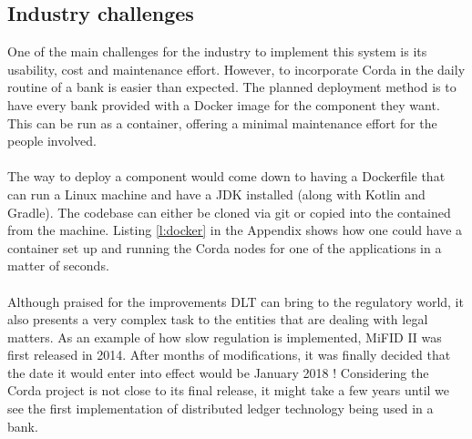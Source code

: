 \documentclass[12pt,twoside]{article}
\begin{document}
\subsection{Industry challenges}
\label{sub:challenges}
One of the main challenges for the industry to implement this system is its usability, cost and maintenance effort. However, to incorporate Corda in the daily routine of a bank is easier than expected. The planned deployment method is to have every bank provided with a Docker image for the component they want. This can be run as a container, offering a minimal maintenance effort for the people involved.
\\ \\
The way to deploy a component would come down to having a Dockerfile that can run a Linux machine and have a JDK installed (along with Kotlin and Gradle). The codebase can either be cloned via git or copied into the contained from the machine. Listing \ref{l:docker} in the Appendix shows how one could have a container set up and running the Corda nodes for one of the applications in a matter of seconds.
\\ \\
Although praised for the improvements DLT can bring to the regulatory world, it also presents a very complex task to the entities that are dealing with legal matters. As an example of how slow regulation is implemented, MiFID II was first released in 2014. After months of modifications, it was finally decided that the date it would enter into effect would be January 2018 \cite{deadlinenew}! Considering the Corda project is not close to its final release, it might take a few years until we see the first implementation of distributed ledger technology being used in a bank.
\newpage
\end{document}

